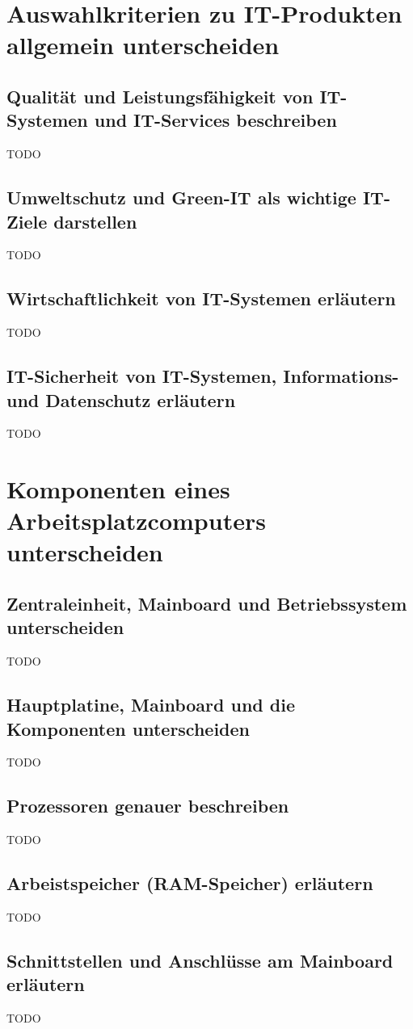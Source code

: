 \documentclass[11pt]{article}
\begin{document}
\newpage
\section{Auswahlkriterien zu IT-Produkten allgemein unterscheiden}
\subsection{Qualität und Leistungsfähigkeit von IT-Systemen und IT-Services beschreiben}
    TODO
\subsection{Umweltschutz und Green-IT als wichtige IT-Ziele darstellen}
    TODO
\subsection{Wirtschaftlichkeit von IT-Systemen erläutern}
    TODO
\subsection{IT-Sicherheit von IT-Systemen, Informations- und Datenschutz erläutern}
    TODO

\newpage
\section{Komponenten eines Arbeitsplatzcomputers unterscheiden}
\subsection{Zentraleinheit, Mainboard und Betriebssystem unterscheiden}
    TODO
\subsection{Hauptplatine, Mainboard und die Komponenten unterscheiden}
    TODO
\subsection{Prozessoren genauer beschreiben}
    TODO
\subsection{Arbeistspeicher (RAM-Speicher) erläutern}
    TODO
\subsection{Schnittstellen und Anschlüsse am Mainboard erläutern}
    TODO
\end{document}
